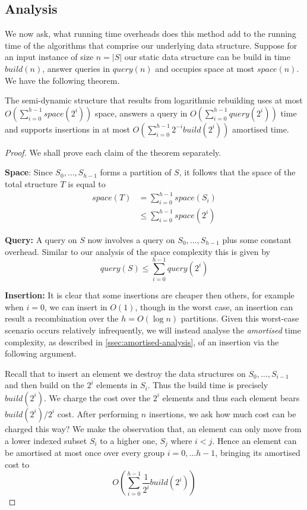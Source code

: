 \subsection{Analysis}
\label{ssec:logarithmic-rebuilding-analysis}

We now ask, what running time overheads does this method add to the running time of the algorithms that comprise our underlying data structure. Suppose for an input instance of size $n = |S|$ our static data structure can be build in time $build(n)$, answer queries in $query(n)$ and occupies space at most $space(n)$. We have the following theorem.

\begin{theorem} The semi-dynamic structure that results from logarithmic rebuilding uses at most $O(\sum_{i=0}^{h-1}space(2^i))$ space, answers a query in $O(\sum_{i=0}^{h-1}query(2^i))$ time and supports insertions in at most $O(\sum_{i=0}^{h-1}2^{-i}build(2^i))$ amortised time.
\end{theorem}

\begin{proof}
    We shall prove each claim of the theorem separately. 

    \textbf{Space}: Since $S_0,\dots,S_{h-1}$ forms a partition of $S$, it follows that the space of the total structure $T$ is equal to 
    \begin{align*}
        space(T) &= \sum_{i=0}^{h-1}space(S_i) \\
               &\leq \sum_{i=0}^{h-1}space(2^i)
    \end{align*}

    \textbf{Query:}  A query on $S$ now involves a query on $S_0, \dots, S_{h-1}$ plus some constant overhead. Similar to our analysis of the space complexity this is given by 
    $$query(S)\leq \sum_{i=0}^{h-1}query(2^i)$$

    \textbf{Insertion:} It is clear that some insertions are cheaper then others, for example when $i=0$, we can insert in $O(1)$, though in the worst case, an insertion can result a recombination over the $h = O(\log n)$ partitions. Given this worst-case scenario occurs relatively infrequently, we will instead analyse the \textit{amortised} time complexity, as described in \cref{ssec:amortised-analysis}, of an insertion via the following argument. 

    Recall that to insert an element we destroy the data structures on $S_0,\dots, S_{i-1}$ and then build on the $2^i$ elements in $S_i$. Thus the build time is precisely $build(2^i)$. We charge the cost over the $2^i$ elements and thus each element bears $build(2^i) / 2^i$ cost. After performing $n$ insertions, we ask how much cost can be charged this way?  We make the observation that, an element can only move from a lower indexed subset $S_i$ to a higher one, $S_j$ where $i < j$. Hence an element can be amortised at most once over every group $i = 0,\dots h-1$, bringing its amortised cost to  
    $$O\left(\sum_{i=0}^{h-1}\frac{1}{2^i}build(2^i)\right)$$
\end{proof}



